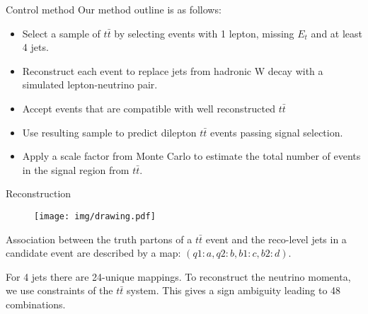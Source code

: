 \documentclass{beamer}
\begin{document}
\begin{frame}{Control method}
Our method outline is as follows:
  \begin{itemize}
    \item Select a sample of $t \bar{t}$ by selecting events with 1 lepton, missing $E_{t}$ and at least 4 jets.
    \item Reconstruct each event to replace jets from hadronic W decay with a simulated lepton-neutrino pair.
    \item Accept events that are compatible with well reconstructed $t \bar{t}$
    \item Use resulting sample to predict dilepton $t \bar{t}$ events passing signal selection.
    \item Apply a scale factor from Monte Carlo to estimate the total number of events in the signal region from $t \bar{t}$.
  \end{itemize}
\end{frame}

\begin{frame}{Reconstruction}
  \begin{figure}
    \centering
    \texttt{[image: img/drawing.pdf]}
  \end{figure}
  Association between the truth partons of a $t \bar{t}$ event and the reco-level jets in a candidate event are described by a map: $\left(q1:a, q2:b, b1:c, b2:d\right)$.

  For 4 jets there are 24-unique mappings. To reconstruct the neutrino momenta, we use constraints of the $t \bar{t}$ system. This gives a sign ambiguity leading to 48 combinations.%
\end{frame}

\end{document}
